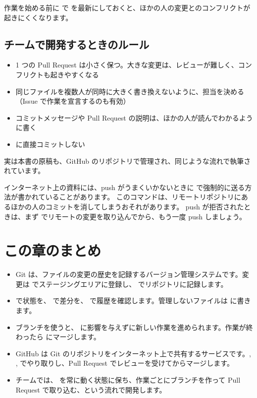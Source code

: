 
作業を始める前に  で  を最新にしておくと、ほかの人の変更とのコンフリクトが起きにくくなります。

\subsection{チームで開発するときのルール}

\begin{itemize}
  \item 1 つの Pull Request は小さく保つ。大きな変更は、レビューが難しく、コンフリクトも起きやすくなる
  \item 同じファイルを複数人が同時に大きく書き換えないように、担当を決める（Issue で作業を宣言するのも有効）
  \item コミットメッセージや Pull Request の説明は、ほかの人が読んでわかるように書く
  \item {} に直接コミットしない
\end{itemize}

実は本書の原稿も、GitHub のリポジトリで管理され、同じような流れで執筆されています。

\begin{caution}
  インターネット上の資料には、push がうまくいかないときに  で強制的に送る方法が書かれていることがあります。
  このコマンドは、リモートリポジトリにあるほかの人のコミットを消してしまうおそれがあります。
  push が拒否されたときは、まず  でリモートの変更を取り込んでから、もう一度 push しましょう。
\end{caution}

\section*{この章のまとめ}

\begin{itemize}
  \item Git は、ファイルの変更の歴史を記録するバージョン管理システムです。変更は  でステージングエリアに登録し、 でリポジトリに記録します。
  \item {} で状態を、 で差分を、 で履歴を確認します。管理しないファイルは  に書きます。
  \item ブランチを使うと、 に影響を与えずに新しい作業を進められます。作業が終わったら  にマージします。
  \item GitHub は Git のリポジトリをインターネット上で共有するサービスです。, ,  でやり取りし、Pull Request でレビューを受けてからマージします。
  \item チームでは、 を常に動く状態に保ち、作業ごとにブランチを作って Pull Request で取り込む、という流れで開発します。
\end{itemize}
